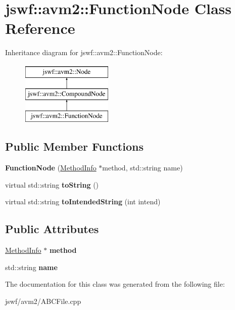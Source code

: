 \hypertarget{classjswf_1_1avm2_1_1_function_node}{\section{jswf\+:\+:avm2\+:\+:Function\+Node Class Reference}
\label{classjswf_1_1avm2_1_1_function_node}
}
Inheritance diagram for jswf\+:\+:avm2\+:\+:Function\+Node\+:\begin{figure}[H]
\begin{center}
\leavevmode
\includegraphics[height=3.000000cm]{classjswf_1_1avm2_1_1_function_node}
\end{center}
\end{figure}
\subsection*{Public Member Functions}
\begin{DoxyCompactItemize}
\item 
\hypertarget{classjswf_1_1avm2_1_1_function_node_a6e9b14a1a8c2a64f368b32b03382f43b}{{\bfseries Function\+Node} (\hyperlink{structjswf_1_1avm2_1_1_method_info}{Method\+Info} $\ast$method, std\+::string name)}\label{classjswf_1_1avm2_1_1_function_node_a6e9b14a1a8c2a64f368b32b03382f43b}

\item 
\hypertarget{classjswf_1_1avm2_1_1_function_node_a7a4910655034f16e413b24c4bce03f3b}{virtual std\+::string {\bfseries to\+String} ()}\label{classjswf_1_1avm2_1_1_function_node_a7a4910655034f16e413b24c4bce03f3b}

\item 
\hypertarget{classjswf_1_1avm2_1_1_function_node_ad29ac109294df956bf923cba2491880f}{virtual std\+::string {\bfseries to\+Intended\+String} (int intend)}\label{classjswf_1_1avm2_1_1_function_node_ad29ac109294df956bf923cba2491880f}

\end{DoxyCompactItemize}
\subsection*{Public Attributes}
\begin{DoxyCompactItemize}
\item 
\hypertarget{classjswf_1_1avm2_1_1_function_node_a345b4c2a3372c6528066826182f15fa2}{\hyperlink{structjswf_1_1avm2_1_1_method_info}{Method\+Info} $\ast$ {\bfseries method}}\label{classjswf_1_1avm2_1_1_function_node_a345b4c2a3372c6528066826182f15fa2}

\item 
\hypertarget{classjswf_1_1avm2_1_1_function_node_a895fd69c46ac77fc8b7c598d1fa38783}{std\+::string {\bfseries name}}\label{classjswf_1_1avm2_1_1_function_node_a895fd69c46ac77fc8b7c598d1fa38783}

\end{DoxyCompactItemize}


The documentation for this class was generated from the following file\+:\begin{DoxyCompactItemize}
\item 
jswf/avm2/A\+B\+C\+File.\+cpp\end{DoxyCompactItemize}
